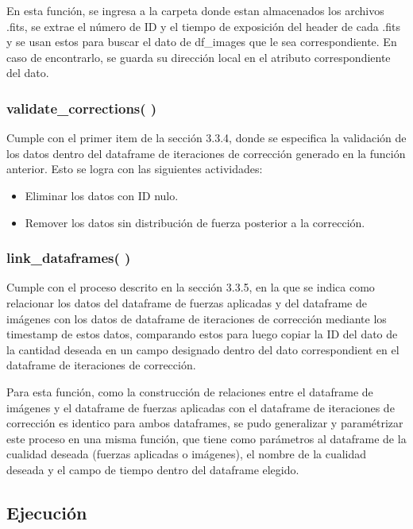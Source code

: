 En esta función, se ingresa a la carpeta donde estan almacenados los archivos .fits, se extrae el número de ID y el tiempo de exposición del header de cada .fits y se usan estos para buscar el dato de df\_images que le sea correspondiente. En caso de encontrarlo, se guarda su dirección local en el atributo correspondiente del dato.

\subsubsection{validate\_corrections( )} 
Cumple con el primer item de la sección 3.3.4, donde se especifica la validación de los datos dentro del dataframe de iteraciones de corrección generado en la función anterior. Esto se logra con las siguientes actividades:

\begin{itemize}
    \item Eliminar los datos con ID nulo.

    \item Remover los datos sin distribución de fuerza posterior a la corrección.
\end{itemize}

\subsubsection{link\_dataframes( )}
Cumple con el proceso descrito en la sección 3.3.5, en la que se indica como relacionar los datos del dataframe de fuerzas aplicadas y del dataframe de imágenes con los datos de dataframe de iteraciones de corrección mediante los timestamp de estos datos, comparando estos para luego copiar la ID del dato de la cantidad deseada en un campo designado dentro del dato correspondient en el dataframe de iteraciones de corrección.

Para esta función, como la construcción de relaciones entre el dataframe de imágenes y el dataframe de fuerzas aplicadas con el dataframe de iteraciones de corrección es identico para ambos dataframes, se pudo generalizar y paramétrizar este proceso en una misma función, que tiene como parámetros al dataframe de la cualidad deseada (fuerzas aplicadas o imágenes), el nombre de la cualidad deseada y el campo de tiempo dentro del dataframe elegido.

\subsection{Ejecución}

